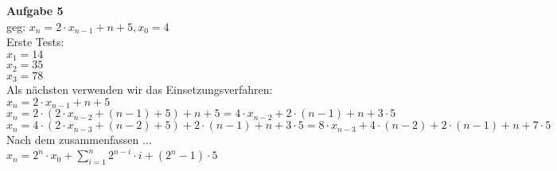 \documentclass[a4paper]{scrartcl}
\begin{document}
	\begin{flushleft}
		\textbf{Aufgabe 5}\\
		geg: $x_n=2\cdot x_{n-1}+n+5, x_0=4$\\
		Erste Tests:\\
		$x_1=14$\\
		$x_2=35$\\
		$x_3=78$\\
		Als nächsten verwenden wir das Einsetzungsverfahren:\\
		$x_n=2\cdot x_{n-1}+n+5$\\
		$x_n=2\cdot(2\cdot x_{n-2}+(n-1)+5)+n+5=4\cdot x_{n-2}+2\cdot(n-1)+n+3\cdot 5$\\
		$x_n=4\cdot(2\cdot x_{n-3}+(n-2)+5)+2\cdot(n-1)+n+3\cdot 5=8\cdot x_{n-3}+4\cdot(n-2)+2\cdot(n-1)+n+7\cdot 5$\\
		Nach dem zusammenfassen ...\\
		$x_n=2^n\cdot x_0+\sum\limits_{i=1}^{n}2^{n-i}\cdot i+(2^n-1)\cdot 5$
	\end{flushleft}
\end{document}
